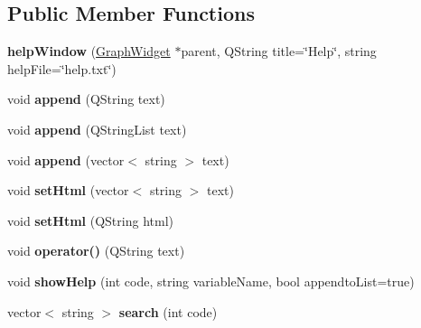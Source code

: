 \subsection*{Public Member Functions}
\begin{DoxyCompactItemize}
\item 
\mbox{\label{classhelp_window_a27e86e85cb509229ed9785bcd0ed559f}} 
{\bfseries help\+Window} (\hyperlink{class_graph_widget}{Graph\+Widget} $\ast$parent, Q\+String title=\char`\"{}Help\char`\"{}, string help\+File=\char`\"{}help.\+txt\char`\"{})
\item 
\mbox{\label{classhelp_window_a004e2168388990dee7bc01d82bd32d9c}} 
void {\bfseries append} (Q\+String text)
\item 
\mbox{\label{classhelp_window_ad973ecf2aa868cb41b5814f06b0066e5}} 
void {\bfseries append} (Q\+String\+List text)
\item 
\mbox{\label{classhelp_window_a49e2773f1681d4bae7f9d22dcf19afb9}} 
void {\bfseries append} (vector$<$ string $>$ text)
\item 
\mbox{\label{classhelp_window_aa3d4a71af2d03b6918bdcb9696a211cb}} 
void {\bfseries set\+Html} (vector$<$ string $>$ text)
\item 
\mbox{\label{classhelp_window_a281048bc54009d1e8966916ab5162d33}} 
void {\bfseries set\+Html} (Q\+String html)
\item 
\mbox{\label{classhelp_window_a1a8ff12214224f845e745942ae818096}} 
void {\bfseries operator()} (Q\+String text)
\item 
\mbox{\label{classhelp_window_a40ed8001ef959771123ca0c82ff7a9e9}} 
void {\bfseries show\+Help} (int code, string variable\+Name, bool appendto\+List=true)
\item 
\mbox{\label{classhelp_window_af5215042c581e24e22ce31f0098455ed}} 
vector$<$ string $>$ {\bfseries search} (int code)
\item 
\mbox{\label{classhelp_window_a344ff88b85e9ea9c202324153528a69a}} 

\end{DoxyCompactItemize}
